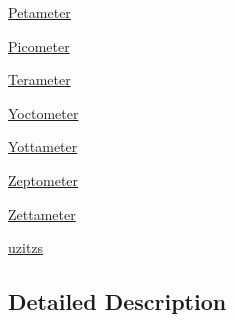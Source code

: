 \begin{DoxyCompactItemize}
\item 
\mbox{\hyperlink{group___e_g_x_math-_conversions-_length_conversions-_s_i-_petameter}{Petameter}}
\item 
\mbox{\hyperlink{group___e_g_x_math-_conversions-_length_conversions-_s_i-_picometer}{Picometer}}
\item 
\mbox{\hyperlink{group___e_g_x_math-_conversions-_length_conversions-_s_i-_terameter}{Terameter}}
\item 
\mbox{\hyperlink{group___e_g_x_math-_conversions-_length_conversions-_s_i-_yoctometer}{Yoctometer}}
\item 
\mbox{\hyperlink{group___e_g_x_math-_conversions-_length_conversions-_s_i-_yottameter}{Yottameter}}
\item 
\mbox{\hyperlink{group___e_g_x_math-_conversions-_length_conversions-_s_i-_zeptometer}{Zeptometer}}
\item 
\mbox{\hyperlink{group___e_g_x_math-_conversions-_length_conversions-_s_i-_zettameter}{Zettameter}}
\item 
\mbox{\hyperlink{group___e_g_x_math-_conversions-_length_conversions-_s_i-uzitzs}{uzitzs}}
\end{DoxyCompactItemize}


\subsection{Detailed Description}
